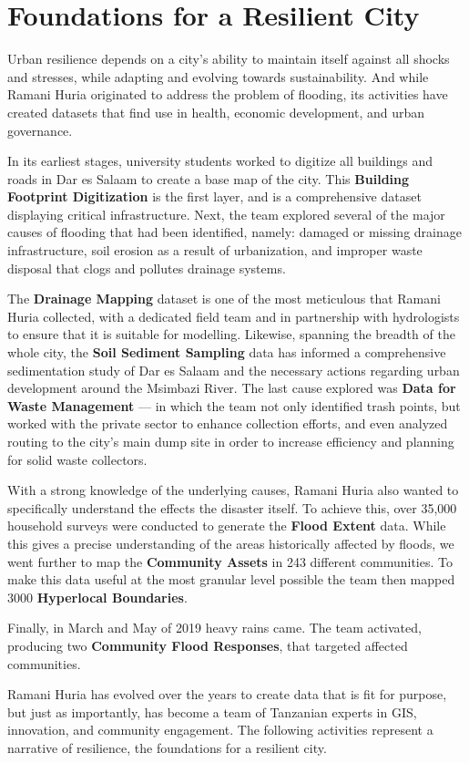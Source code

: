 \documentclass[a4paper,12pt,twoside]{article}
\begin{document}
\newpage
\section{Foundations for a Resilient City}
\begin{multicols}{2}
Urban resilience depends on a city’s ability to maintain itself against all shocks and stresses, while adapting and evolving towards sustainability. And while Ramani Huria originated to address the problem of flooding, its activities have created datasets that find use in health, economic development, and urban governance. 

In its earliest stages, university students worked to digitize all buildings and roads in Dar es Salaam to create a base map of the city.  This \textbf{Building Footprint Digitization} is the first layer, and is a comprehensive dataset displaying critical infrastructure. Next, the team explored several of the major causes of flooding that had been identified, namely: damaged or missing drainage infrastructure, soil erosion as a result of urbanization, and improper waste disposal that clogs and pollutes drainage systems. 

The \textbf{Drainage Mapping} dataset is one of the most meticulous that Ramani Huria collected, with a dedicated field team  and in partnership with hydrologists to ensure that it is suitable for modelling. Likewise, spanning the breadth of the whole city, the \textbf{Soil Sediment Sampling} data has informed a comprehensive sedimentation study of Dar es Salaam and the necessary actions regarding urban development around the Msimbazi River. The last cause explored was  \textbf{Data for Waste Management} --- in which the team not only identified trash points, but worked with the private sector to enhance collection efforts, and even analyzed routing to the city’s main dump site in order to increase efficiency and planning for solid waste collectors. 

With a strong knowledge of the underlying causes, Ramani Huria also wanted to specifically understand the effects the disaster itself. To achieve this, over 35,000 household surveys were conducted to generate the \textbf{Flood Extent} data. While this gives a precise understanding of the areas historically affected by floods, we went further to map the \textbf{Community Assets} in 243 different communities. To make this data useful at the most granular level possible the team then mapped 3000 \textbf{Hyperlocal Boundaries}.

Finally, in March and May of 2019 heavy rains came. The team activated, producing two \textbf{Community Flood Responses}, that targeted affected communities. 

Ramani Huria has evolved over the years to create data that is fit for purpose, but just as importantly, has become a team of Tanzanian experts in GIS, innovation, and community engagement. The following activities represent a narrative of resilience, the foundations for a resilient city. 

\end{multicols}
\end{document}
